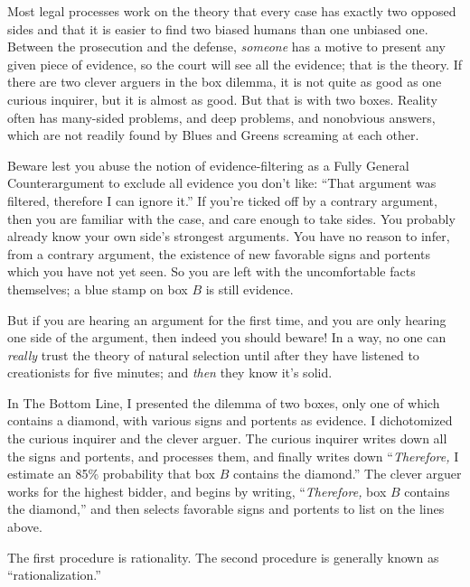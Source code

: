 {
 Most legal processes work on the theory that every case has
exactly two opposed sides and that it is easier to find two biased
humans than one unbiased one. Between the prosecution and the defense,
\textit{someone} has a motive to present any given piece of evidence,
so the court will see all the evidence; that is the theory. If there
are two clever arguers in the box dilemma, it is not quite as good as
one curious inquirer, but it is almost as good. But that is with two
boxes. Reality often has many-sided problems, and deep problems, and
nonobvious answers, which are not readily found by Blues and Greens
screaming at each other.}

{
 Beware lest you abuse the notion of evidence-filtering as a Fully
General Counterargument to exclude all evidence you
don't like: ``That argument was
filtered, therefore I can ignore it.'' If
you're ticked off by a contrary argument, then you are
familiar with the case, and care enough to take sides. You probably
already know your own side's strongest arguments. You
have no reason to infer, from a contrary argument, the existence of new
favorable signs and portents which you have not yet seen. So you are
left with the uncomfortable facts themselves; a blue stamp on box $B$ is
still evidence.}

{
 But if you are hearing an argument for the first time, and you are
only hearing one side of the argument, then indeed you should beware!
In a way, no one can \textit{really} trust the theory of natural
selection until after they have listened to creationists for five
minutes; and \textit{then} they know it's solid.}

\myendsectiontext


{
 In The Bottom Line, I presented the dilemma of two boxes, only one
of which contains a diamond, with various signs and portents as
evidence. I dichotomized the curious inquirer and the clever arguer.
The curious inquirer writes down all the signs and portents, and
processes them, and finally writes down
``\textit{Therefore,} I estimate an 85\% probability
that box $B$ contains the diamond.'' The clever arguer
works for the highest bidder, and begins by writing,
``\textit{Therefore,} box $B$ contains the
diamond,'' and then selects favorable signs and
portents to list on the lines above. }

{
 The first procedure is rationality. The second procedure is
generally known as
``rationalization.''}

